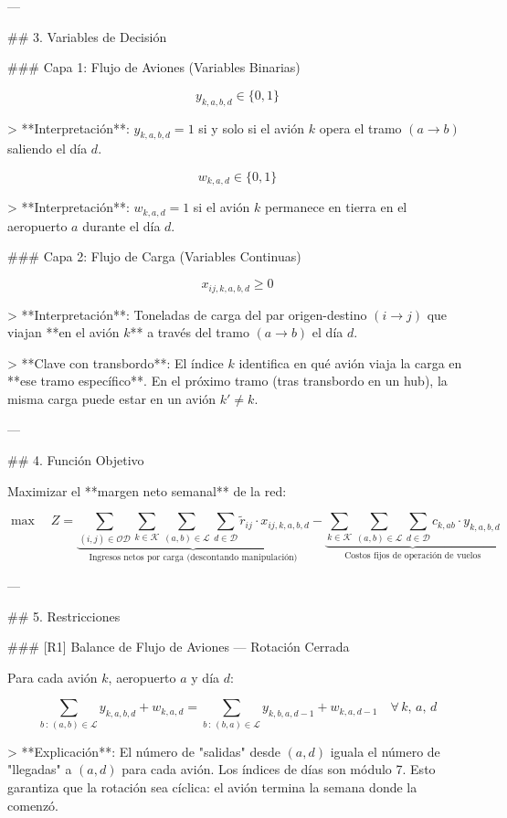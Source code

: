 ---

## 3. Variables de Decisión

### Capa 1: Flujo de Aviones (Variables Binarias)

$$
y_{k,a,b,d} \in \{0, 1\}
$$

> **Interpretación**: $y_{k,a,b,d} = 1$ si y solo si el avión $k$ opera el tramo $(a \to b)$ saliendo el día $d$.

$$
w_{k,a,d} \in \{0, 1\}
$$

> **Interpretación**: $w_{k,a,d} = 1$ si el avión $k$ permanece en tierra en el aeropuerto $a$ durante el día $d$.

### Capa 2: Flujo de Carga (Variables Continuas)

$$
x_{ij,k,a,b,d} \geq 0
$$

> **Interpretación**: Toneladas de carga del par origen-destino $(i \to j)$ que viajan **en el avión $k$** a través del tramo $(a \to b)$ el día $d$.

> **Clave con transbordo**: El índice $k$ identifica en qué avión viaja la carga en **ese tramo específico**. En el próximo tramo (tras transbordo en un hub), la misma carga puede estar en un avión $k' \neq k$.

---

## 4. Función Objetivo

Maximizar el **margen neto semanal** de la red:

$$
\max \quad Z = \underbrace{\sum_{(i,j) \in \mathcal{OD}} \sum_{k \in \mathcal{K}} \sum_{(a,b) \in \mathcal{L}} \sum_{d \in \mathcal{D}} \tilde{r}_{ij} \cdot x_{ij,k,a,b,d}}_{\text{Ingresos netos por carga (descontando manipulación)}} - \underbrace{\sum_{k \in \mathcal{K}} \sum_{(a,b) \in \mathcal{L}} \sum_{d \in \mathcal{D}} c_{k,ab} \cdot y_{k,a,b,d}}_{\text{Costos fijos de operación de vuelos}}
$$

---

## 5. Restricciones

### [R1] Balance de Flujo de Aviones — Rotación Cerrada

Para cada avión $k$, aeropuerto $a$ y día $d$:

$$
\sum_{b \,:\, (a,b) \in \mathcal{L}} y_{k,a,b,d} + w_{k,a,d} = \sum_{b \,:\, (b,a) \in \mathcal{L}} y_{k,b,a,d-1} + w_{k,a,d-1} \quad \forall\, k,\, a,\, d
$$

> **Explicación**: El número de "salidas" desde $(a, d)$ iguala el número de "llegadas" a $(a, d)$ para cada avión. Los índices de días son módulo 7. Esto garantiza que la rotación sea cíclica: el avión termina la semana donde la comenzó.


